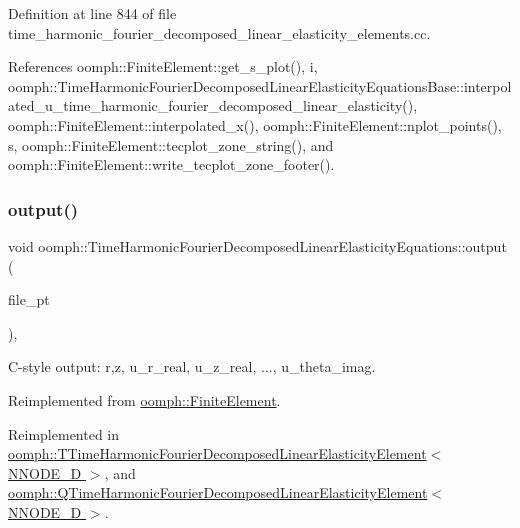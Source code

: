 Definition at line 844 of file time\+\_\+harmonic\+\_\+fourier\+\_\+decomposed\+\_\+linear\+\_\+elasticity\+\_\+elements.\+cc.



References oomph\+::\+Finite\+Element\+::get\+\_\+s\+\_\+plot(), i, oomph\+::\+Time\+Harmonic\+Fourier\+Decomposed\+Linear\+Elasticity\+Equations\+Base\+::interpolated\+\_\+u\+\_\+time\+\_\+harmonic\+\_\+fourier\+\_\+decomposed\+\_\+linear\+\_\+elasticity(), oomph\+::\+Finite\+Element\+::interpolated\+\_\+x(), oomph\+::\+Finite\+Element\+::nplot\+\_\+points(), s, oomph\+::\+Finite\+Element\+::tecplot\+\_\+zone\+\_\+string(), and oomph\+::\+Finite\+Element\+::write\+\_\+tecplot\+\_\+zone\+\_\+footer().

\mbox{\label{classoomph_1_1TimeHarmonicFourierDecomposedLinearElasticityEquations_ae2f89d9d35bf4904328dd32e7f8abbfa}} 
\subsubsection{\texorpdfstring{output()}{output()}\hspace{0.1cm}{\footnotesize\ttfamily [3/4]}}
{\footnotesize\ttfamily void oomph\+::\+Time\+Harmonic\+Fourier\+Decomposed\+Linear\+Elasticity\+Equations\+::output (\begin{DoxyParamCaption}\item[{F\+I\+LE $\ast$}]{file\+\_\+pt }\end{DoxyParamCaption})\hspace{0.3cm}{\ttfamily [inline]}, {\ttfamily [virtual]}}



C-\/style output\+: r,z, u\+\_\+r\+\_\+real, u\+\_\+z\+\_\+real, ..., u\+\_\+theta\+\_\+imag. 



Reimplemented from \hyperlink{classoomph_1_1FiniteElement_a72cddd09f8ddbee1a20a1ff404c6943e}{oomph\+::\+Finite\+Element}.



Reimplemented in \hyperlink{classoomph_1_1TTimeHarmonicFourierDecomposedLinearElasticityElement_a81a75203b1c0d2f110259547e51c8cac}{oomph\+::\+T\+Time\+Harmonic\+Fourier\+Decomposed\+Linear\+Elasticity\+Element$<$ N\+N\+O\+D\+E\+\_\+D $>$}, and \hyperlink{classoomph_1_1QTimeHarmonicFourierDecomposedLinearElasticityElement_afc1d5ed96b566665d0a90c79ee347028}{oomph\+::\+Q\+Time\+Harmonic\+Fourier\+Decomposed\+Linear\+Elasticity\+Element$<$ N\+N\+O\+D\+E\+\_\+D $>$}.



